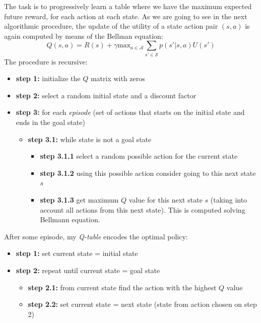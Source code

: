 The task is to progressively learn a table where we have the maximum expected future
reward, for each action at each state. As we are going to see in the next algorithmic
procedure, the update of the utility of a state action pair $(s,a)$ is again
computed by means of the Bellman equation:
\begin{equation}
	Q(s,a) = R(s) + \gamma \text{max}_{a \in \mathcal{A}}\sum_{s' \in \mathcal{S}}p
	(s'|s,a) U(s')
\end{equation}
The procedure is recursive:
\begin{itemize}
	\item \textbf{step 1:} initialize the $Q$ matrix with zeros

	\item \textbf{step 2:} select a random initial state and a discount factor

	\item \textbf{step 3:} for each \textit{episode} (set of actions that starts
		on the initial state and ends in the goal state)
		\begin{itemize}
			\item \textbf{step 3.1:} while state is not a goal state
				\begin{itemize}
					\item \textbf{step 3.1.1} select a random possible action for the
						current state

					\item \textbf{step 3.1.2} using this possible action consider going to
						this next state $s$

					\item \textbf{step 3.1.3} get maximum $Q$ value for this next state
						$s$ (taking into account all actions from this next state). This is computed
						solving Bellmann equation.
				\end{itemize}
		\end{itemize}
\end{itemize}

After some episode, my \textit{Q-table} encodes the optimal policy:
\begin{itemize}
	\item \textbf{step 1:} set current state = initial state

	\item \textbf{step 2:} repeat until current state = goal state

		\begin{itemize}
			\item \textbf{step 2.1:} from current state find the action with the
				highest $Q$ value

			\item \textbf{step 2.2:} set current state = next state (state from action
				chosen on step 2)
		\end{itemize}
\end{itemize}

